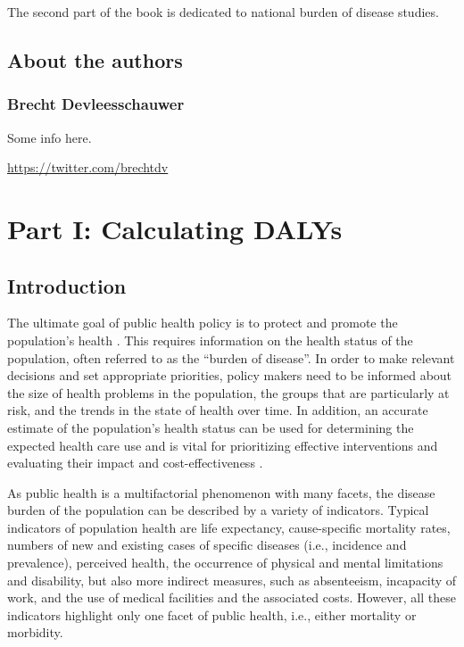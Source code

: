 \documentclass[]{book}
\begin{document}
The second part of the book is dedicated to national burden of disease
studies.

\chapter*{About the authors}\label{about-the-authors}

\section*{Brecht Devleesschauwer}\label{brecht-devleesschauwer}

Some info here.

\url{https://twitter.com/brechtdv}

\part*{Part I: Calculating
DALYs}\label{part-part-i-calculating-dalys}

\chapter{Introduction}\label{introduction}

The ultimate goal of public health policy is to protect and promote the
population's health \citep{devleesschauwer2014quantifying}. This
requires information on the health status of the population, often
referred to as the ``burden of disease''. In order to make relevant
decisions and set appropriate priorities, policy makers need to be
informed about the size of health problems in the population, the groups
that are particularly at risk, and the trends in the state of health
over time. In addition, an accurate estimate of the population's health
status can be used for determining the expected health care use and is
vital for prioritizing effective interventions and evaluating their
impact and cost-effectiveness \citep{baltussen2003making}.

As public health is a multifactorial phenomenon with many facets, the
disease burden of the population can be described by a variety of
indicators. Typical indicators of population health are life expectancy,
cause-specific mortality rates, numbers of new and existing cases of
specific diseases (i.e., incidence and prevalence), perceived health,
the occurrence of physical and mental limitations and disability, but
also more indirect measures, such as absenteeism, incapacity of work,
and the use of medical facilities and the associated costs. However, all
these indicators highlight only one facet of public health, i.e., either
mortality or morbidity.
\end{document}
